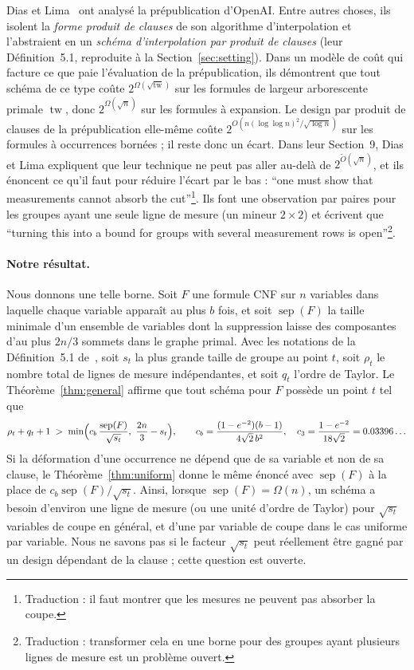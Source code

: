 \documentclass[11pt,a4paper]{article}
\makeatletter
\theoremstyle{definition}
\theoremstyle{remark}
\newcommand{\sep}{\operatorname{sep}}
\newcommand{\tw}{\operatorname{tw}}
\newcommand{\englishhyph}{\@ifundefined{l@english}{}{\language\l@english}}
\newcommand{\eng}[1]{{\englishhyph #1}}
\makeatother
\begin{document}
Dias et Lima~\cite{DL} ont analysé la prépublication d'OpenAI. Entre autres choses, ils
isolent la \emph{forme produit de clauses} de son algorithme d'interpolation et l'abstraient
en un \emph{schéma d'interpolation par produit de clauses} (leur Définition~5.1, reproduite
à la Section~\ref{sec:setting}). Dans un modèle de coût qui facture ce que paie l'évaluation
de la prépublication, ils démontrent que tout schéma de ce type coûte
$2^{\Omega(\sqrt{\tw})}$ sur les formules de largeur arborescente primale $\tw$, donc
$2^{\Omega(\sqrt n)}$ sur les formules à expansion. Le design par produit de clauses de la
prépublication elle-même coûte $2^{O(n(\log\log n)^2/\sqrt{\log n})}$ sur les formules à
occurrences bornées ; il reste donc un écart. Dans leur Section~9, Dias et Lima expliquent
que leur technique ne peut pas aller au-delà de $2^{\tilde O(\sqrt n)}$, et ils énoncent ce
qu'il faut pour réduire l'écart par le bas : \eng{``one must show that measurements cannot
absorb the cut''}\footnote{Traduction : \og il faut montrer que les mesures ne peuvent pas
absorber la coupe\fg{}.}. Ils font une observation par paires pour les groupes ayant une
seule ligne de mesure (un mineur $2\times2$) et écrivent que \eng{``turning this into a
bound for groups with several measurement rows is open''}\footnote{Traduction : \og
transformer cela en une borne pour des groupes ayant plusieurs lignes de mesure est un
problème ouvert\fg{}.}.

\paragraph{Notre résultat.} Nous donnons une telle borne. Soit $F$ une formule CNF sur $n$
variables dans laquelle chaque variable apparaît au plus $b$ fois, et soit $\sep(F)$ la
taille minimale d'un ensemble de variables dont la suppression laisse des composantes d'au
plus $2n/3$ sommets dans le graphe primal. Avec les notations de la Définition~5.1
de~\cite{DL}, soit $s_t$ la plus grande taille de groupe au point $t$, soit $\rho_t$ le
nombre total de lignes de mesure indépendantes, et soit $q_t$ l'ordre de Taylor. Le
Théorème~\ref{thm:general} affirme que tout schéma pour $F$ possède un point $t$ tel que
\begin{equation}\label{eq:intro}
\rho_t+q_t+1\;>\;\min\Bigl(c_b\,\frac{\sep(F)}{\sqrt{s_t}},\ \frac{2n}{3}-s_t\Bigr),
\qquad c_b=\frac{(1-e^{-2})(b-1)}{4\sqrt2\,b^2},\quad c_3=\frac{1-e^{-2}}{18\sqrt2}=0.03396\ldots
\end{equation}
Si la déformation d'une occurrence ne dépend que de sa variable et non de sa clause, le
Théorème~\ref{thm:uniform} donne le même énoncé avec $\sep(F)$ à la place de
$c_b\sep(F)/\sqrt{s_t}$. Ainsi, lorsque $\sep(F)=\Omega(n)$, un schéma a besoin d'environ
une ligne de mesure (ou une unité d'ordre de Taylor) pour $\sqrt{s_t}$ variables de coupe en
général, et d'une par variable de coupe dans le cas uniforme par variable. Nous ne savons pas
si le facteur $\sqrt{s_t}$ peut réellement être gagné par un design dépendant de la clause ;
cette question est ouverte.
\end{document}
